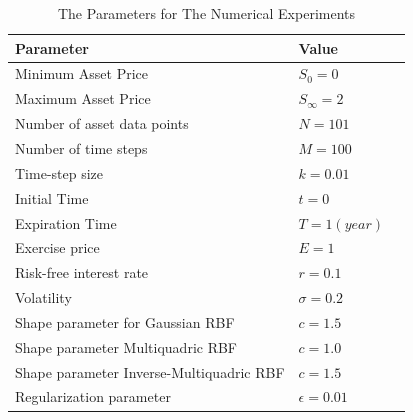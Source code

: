 \documentclass[12pt]{article}
\numberwithin{equation}{subsection} %
\begin{document}
\begin{table}[h]

\centering
 \caption{The  Parameters for The  Numerical Experiments}
 \vspace{5mm}
\begin{tabular}{llr}
\hline\hline
\cline{1-2}
Parameter & Value   \\
\hline\hline
Minimum Asset Price  & $S_{0}=0$  \\
Maximum Asset Price  & $S_{\infty}=2$  \\
Number of asset data points  &$N=101$    \\
Number of time steps  & $M=100$ \\
Time-step size & $k=0.01$  \\
Initial Time  & $t=0$ \\
Expiration Time  & $T=1(year)$ \\
Exercise price & $E=1$ \\
Risk-free interest rate          &$r=0.1$  \\
Volatility    & $\sigma=0.2$ \\
Shape parameter for Gaussian RBF& $c=1.5$ \\
Shape parameter Multiquadric RBF& $c=1.0$ \\
Shape parameter Inverse-Multiquadric RBF& $c=1.5$ \\
 Regularization parameter& $\epsilon=0.01$\\
 \hline \hline
\end{tabular}

\end{table}


\newpage
\end{document}
